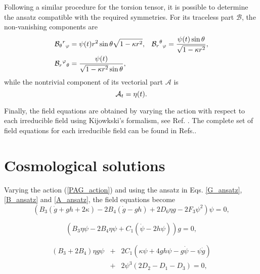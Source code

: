 Following a similar procedure for the torsion tensor, it is possible to determine the ansatz compatible with 
the required symmetries. For its traceless part $\mathcal{B}$, the non-vanishing components are
\begin{equation}
\label{B_ansatz}
\begin{aligned}
    \mathcal{B}_{\theta}{}^{ r}{}_{\varphi} & = \psi (t) r^2\sin\theta \sqrt{1 - \kappa r^2}, &
    \mathcal{B}_{r}{}^{ \theta}{}_{\varphi} & =\frac{\psi (t) \sin \theta}{\sqrt{1 - \kappa r^2}}, \\
    \mathcal{B}_{r}{}^{ \varphi}{}_{\theta} & =\frac{\psi(t)}{ \sqrt{1-\kappa r^{2}} \sin \theta},
\end{aligned}
\end{equation}
while the nontrivial component of its vectorial part $\mathcal{A}$ is
\begin{equation}
    \label{A_ansatz}
    \mathcal{A}_{t} = \eta(t).
\end{equation}

Finally, the field equations are obtained by varying the action with respect to each irreducible field using Kijowkski's 
formalism, see Ref. \cite{KJ_Formalism,Castillo_Felisola_2020}. The complete  set of field equations for each irreducible field can be found in Refs.\cite{Castillo_Felisola_2020,Castillo-Felisola_2023}.

\section{Cosmological solutions}
\label{sec:solutions}
Varying the action (\ref{PAG_action}) and using the ansatz in Eqs. \eqref{G_ansatz}, \eqref{B_ansatz} and \eqref{A_ansatz}, the field equations become
\begin{equation}
    \label{Feq_1}
    \left(B_3\left(\dot{g} + gh + 2\kappa\right) - 2B_4\left(\dot{g} - gh\right) + 2D_6\eta g - 2F_3\psi^2\right)\psi = 0,
\end{equation}

\begin{equation}
    \label{Feq_2}
    \left(B_3\eta\psi -2B_4\eta\psi + C_1\left(\dot{\psi} - 2h\psi\right)\right)g = 0,
\end{equation}

\begin{eqnarray}
    \label{Feq_3}
    \left(B_3 + 2B_4\right)\eta g\psi &+& 2C_1\left(\kappa\psi + 4gh\psi - g\dot{\psi} - \psi\dot{g}\right) \nonumber \\ &+& 2\psi^3\left(2D_2 - D_1 - D_3\right) = 0,
\end{eqnarray}

